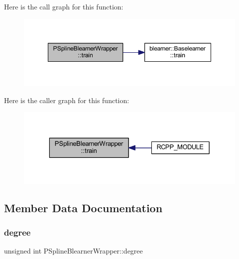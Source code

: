 Here is the call graph for this function\+:\nopagebreak
\begin{figure}[H]
\begin{center}
\leavevmode
\includegraphics[width=348pt]{class_p_spline_blearner_wrapper_a10193fd93f82c2c333e704d7cb67dd27_cgraph}
\end{center}
\end{figure}
Here is the caller graph for this function\+:\nopagebreak
\begin{figure}[H]
\begin{center}
\leavevmode
\includegraphics[width=329pt]{class_p_spline_blearner_wrapper_a10193fd93f82c2c333e704d7cb67dd27_icgraph}
\end{center}
\end{figure}


\subsection{Member Data Documentation}
\mbox{\label{class_p_spline_blearner_wrapper_a3828bb3245f840146ed83b0f9b3777f3}} 
\subsubsection{\texorpdfstring{degree}{degree}}
{\footnotesize\ttfamily unsigned int P\+Spline\+Blearner\+Wrapper\+::degree\hspace{0.3cm}{\ttfamily [private]}}

\mbox{\label{class_p_spline_blearner_wrapper_ac9e6f943e55476a93df376020818f44c}} 
